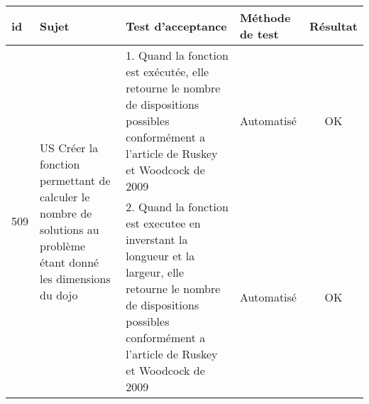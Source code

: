 \noindent%
\begin{adjustwidth}{-1.5cm}{0cm}

    \renewcommand{\arraystretch}{1.2}
    {\setlength{\tabcolsep}{1.5 mm}
        \begin{tabular}{|m{0.6cm}|m{5.5cm}|m{8cm}|m{2cm}|c|} \hline
            id                                                                                                       & Sujet                                                                                                                                  & Test d'acceptance                                                                                                                                                                   & Méthode de test & Résultat \\ \hline
            \multirow{2}{0.6cm}{509}                                                                                 & \multirow{2}{5.5cm}{US Créer la fonction permettant de calculer le nombre de solutions au problème étant donné les dimensions du dojo} & 1. Quand la fonction est exécutée, elle retourne le nombre de dispositions possibles conformément a l'article de Ruskey et Woodcock de 2009                                         & Automatisé      & OK       \\ \cline{3-5}
                                                                                                                     &                                                                                                                                        & 2. Quand la fonction est executee en inverstant la longueur et la largeur, elle retourne le nombre de dispositions possibles conformément a l'article de Ruskey et Woodcock de 2009 & Automatisé      & OK       \\ \hline


\end{tabular}}
\end{adjustwidth}
